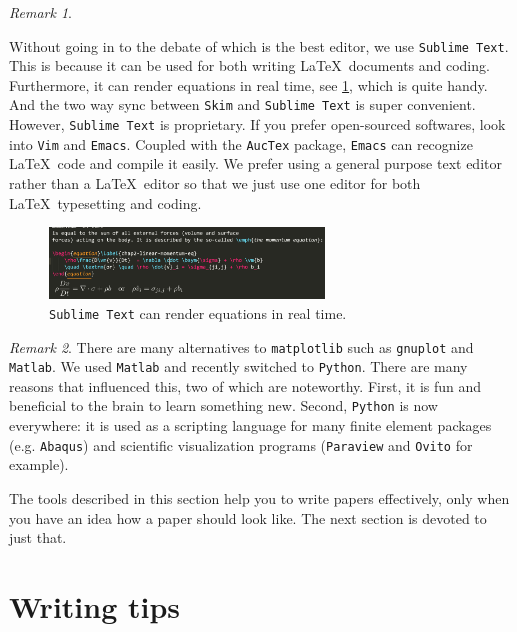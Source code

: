 \documentclass[authoryear,3p,times,preprint,review,fleqn]{elsarticle}
\numberwithin{equation}{section}
\theoremstyle{remark}
\newtheorem{rmk}{Remark}
\begin{document}
\begin{rmk}\label{rm:a}

Without going in to the debate of which is the best editor, we use \texttt{Sublime Text}. This is
because it can be used for both writing \LaTeX\ documents and coding. Furthermore, it can render equations in real time, see  \cref{fig:sublime-text}, which is quite handy. And the two way sync between \texttt{Skim} and \texttt{Sublime Text} is super convenient. However, \texttt{Sublime Text} is proprietary. If you prefer open-sourced softwares, look into \texttt{Vim} and \texttt{Emacs}. Coupled with the \texttt{AucTex} package, \texttt{Emacs} can recognize \LaTeX\ code and compile it easily. We prefer using a general purpose text editor rather than a \LaTeX\ editor so that we just use one editor  for both \LaTeX\ typesetting and coding. 


\begin{figure}[h!]
  \centering 
   \includegraphics[width=0.65\textwidth]{sublime-text}
   \caption{\texttt{Sublime Text} can render equations in real time.}
\label{fig:sublime-text}
\end{figure}
\end{rmk}

\begin{rmk}\label{rm:a}
There are many alternatives to \texttt{matplotlib} such as \texttt{gnuplot} and \texttt{Matlab}. We used  \texttt{Matlab} and recently switched to \texttt{Python}. There are many reasons that influenced this, two of which are noteworthy. First, it is fun and beneficial to the brain to learn something new. Second, \texttt{Python} is now everywhere: it is used as a scripting language for many finite element packages (e.g. \texttt{Abaqus}) and scientific visualization programs (\texttt{Paraview} and \texttt{Ovito} for example).
\end{rmk}


The tools described in this section help you to write papers effectively, only when you have an idea how a paper should look like. The next section is devoted to just that. 

\section{Writing tips}\label{sec:writing-tips}
\end{document}
